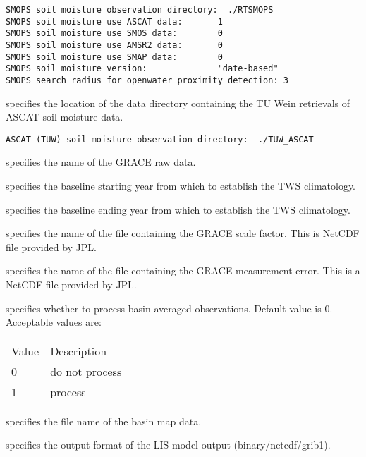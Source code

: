  \begin{Verbatim}[frame=single]
SMOPS soil moisture observation directory:  ./RTSMOPS
SMOPS soil moisture use ASCAT data:       1
SMOPS soil moisture use SMOS data:        0
SMOPS soil moisture use AMSR2 data:       0
SMOPS soil moisture use SMAP data:        0
SMOPS soil moisture version:              "date-based"
SMOPS search radius for openwater proximity detection: 3
 \end{Verbatim}

 
 specifies the location of the data directory containing the TU Wein
 retrievals of ASCAT soil moisture data.
 

 \begin{Verbatim}[frame=single]
ASCAT (TUW) soil moisture observation directory:  ./TUW_ASCAT
 \end{Verbatim}


 
 specifies the name of the GRACE raw data.

 specifies the baseline starting year from which to establish the TWS
 climatology.

 specifies the baseline ending year from which to establish the TWS
 climatology.

  specifies the name of the file
 containing the GRACE scale factor.  This is NetCDF file provided
 by JPL.

  specifies the name of the file
 containing the GRACE measurement error.  This is a NetCDF file provided
 by JPL.

  specifies whether to
 process basin averaged observations.  Default value is 0.
 Acceptable values are:

 \begin{tabular}{ll}
 Value & Description    \\
 0     & do not process \\
 1     & process        \\
 \end{tabular}

  specifies the file name of the
 basin map data.

 specifies the output format of the LIS model output
 (binary/netcdf/grib1).

